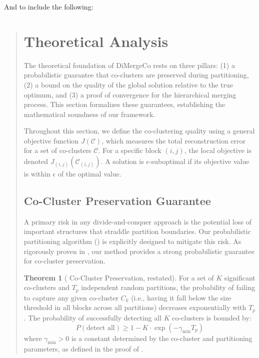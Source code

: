 \documentclass{ar2rc}
\theoremstyle{definition}
\newtheorem*{theorem*}{Theorem}
\theoremstyle{remark} %
\begin{document}
And  to include the following:

\begin{quote}
  \section*{ Theoretical Analysis}
  The theoretical foundation of DiMergeCo rests on three pillars: (1) a probabilistic guarantee that co-clusters are preserved during partitioning, (2) a bound on the quality of the global solution relative to the true optimum, and (3) a proof of convergence for the hierarchical merging process. This section formalizes these guarantees, establishing the mathematical soundness of our framework.

  Throughout this section, we define the co-clustering quality using a general objective function $J(\mathcal{C})$, which measures the total reconstruction error for a set of co-clusters $\mathcal{C}$. For a specific block $(i,j)$, the local objective is denoted $J_{(i,j)}(\mathcal{C}_{(i,j)})$. A solution is $\epsilon$-suboptimal if its objective value is within $\epsilon$ of the optimal value.

  \subsection*{ Co-Cluster Preservation Guarantee}
  A primary risk in any divide-and-conquer approach is the potential loss of important structures that straddle partition boundaries. Our probabilistic partitioning algorithm () is explicitly designed to mitigate this risk. As rigorously proven in , our method provides a strong probabilistic guarantee for co-cluster preservation.

  \begin{theorem*}[ Co-Cluster Preservation, restated]
    For a set of $K$ significant co-clusters and $T_p$ independent random partitions, the probability of failing to capture any given co-cluster $C_k$ (i.e., having it fall below the size threshold in all blocks across all partitions) decreases exponentially with $T_p$. The probability of successfully detecting all $K$ co-clusters is bounded by:
    \begin{equation}
      P(\text{detect all}) \ge 1 - K \cdot \exp(-\gamma_{\min} T_p)
    \end{equation}
    where $\gamma_{\min} > 0$ is a constant determined by the co-cluster and partitioning parameters, as defined in the proof of .
  \end{theorem*}


\end{quote}
\end{document}
